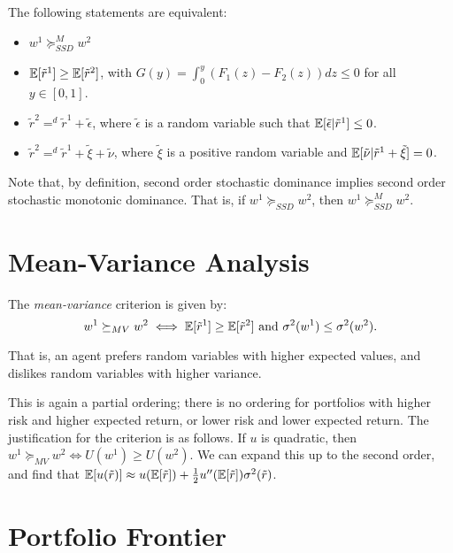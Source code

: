 \documentclass[twoside, titlepage]{article}
\begin{document}
\begin{proposition}
    The following statements are equivalent:
    \begin{itemize}
        \item $w^1 \succeq_{SSD}^M w^2$
        \item $\mathbb{E}[\tilde{r}^1] \geq \mathbb{E}[\tilde{r}^2]$, with $G(y) = \int_0^y\left(F_1(z) - F_2(z)\right) dz \leq 0$ for all $y \in [0, 1]$.
        \item $\tilde{r}^2 =^d \tilde{r}^1 + \tilde{\epsilon}$, where $\tilde{\epsilon}$ is a random variable such that $\mathbb{E}[\tilde{\epsilon} | \tilde{r}^1] \leq 0$.
        \item $\tilde{r}^2 =^d \tilde{r}^1 + \tilde{\xi} + \tilde{\nu}$, where $\tilde{\xi}$ is a positive random variable and $\mathbb{E}[\tilde{\nu} | \tilde{r}^1 + \tilde{\xi}] = 0$.
    \end{itemize}
\end{proposition}

Note that, by definition, second order stochastic dominance implies second order stochastic monotonic dominance. That is, if $w^1 \succeq_{SSD} w^2$, then $w^1 \succeq_{SSD}^M w^2$.

\section{Mean-Variance Analysis}

The \textit{mean-variance} criterion is given by:
\[
    w^1 \succeq_{MV} w^2 \iff \mathbb{E}[\tilde{r}^1] \geq \mathbb{E}[\tilde{r}^2] \text{ and } \sigma^2(w^1) \leq \sigma^2(w^2).
\]
\begin{explanation}
    That is, an agent prefers random variables with higher expected values, and dislikes random variables with higher variance.
\end{explanation}
This is again a partial ordering; there is no ordering for portfolios with higher risk and higher expected return, or lower risk and lower expected return. The justification for the criterion is as follows. If $u$ is quadratic, then $w^1 \succeq_{MV} w^2 \iff U(w^1) \geq U(w^2)$. We can expand this up to the second order, and find that $\mathbb{E}[u(\tilde{r})] \approx u(\mathbb{E}[\tilde{r}]) + \frac{1}{2}u''(\mathbb{E}[\tilde{r}])\sigma^2(\tilde{r})$.


\section{Portfolio Frontier}
\end{document}
